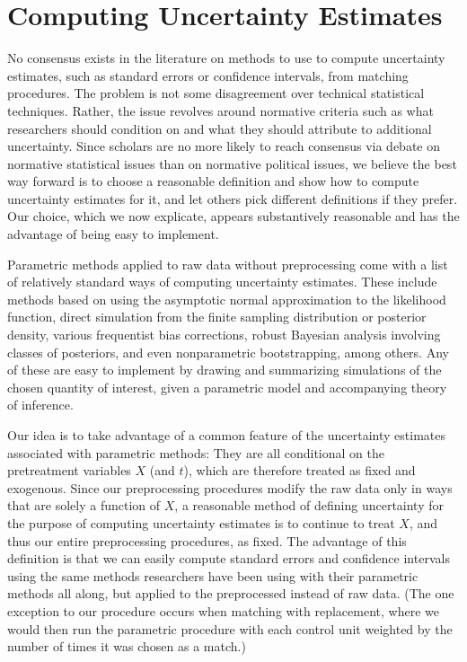 \documentclass[11pt,titlepage]{article}
\begin{document}
\section{Computing Uncertainty Estimates}

No consensus exists in the literature on methods to use to compute
uncertainty estimates, such as standard errors or confidence
intervals, from matching procedures.  The problem is not some
disagreement over technical statistical techniques.  Rather, the issue
revolves around normative criteria such as what researchers should
condition on and what they should attribute to additional uncertainty.
Since scholars are no more likely to reach consensus via debate on
normative statistical issues than on normative political issues, we
believe the best way forward is to choose a reasonable definition and
show how to compute uncertainty estimates for it, and let others pick
different definitions if they prefer.  Our choice, which we now
explicate, appears substantively reasonable and has the advantage of
being easy to implement.

Parametric methods applied to raw data without preprocessing come with
a list of relatively standard ways of computing uncertainty estimates.
These include methods based on using the asymptotic normal
approximation to the likelihood function, direct simulation from the
finite sampling distribution or posterior density, various frequentist
bias corrections, robust Bayesian analysis involving classes of
posteriors, and even nonparametric bootstrapping, among others.  Any
of these are easy to implement by drawing and summarizing simulations
of the chosen quantity of interest, given a parametric model and
accompanying theory of inference.

Our idea is to take advantage of a common feature of the uncertainty
estimates associated with parametric methods: They are all conditional
on the pretreatment variables $X$ (and $t$), which are therefore
treated as fixed and exogenous.  Since our preprocessing procedures
modify the raw data only in ways that are solely a function of $X$, a
reasonable method of defining uncertainty for the purpose of computing
uncertainty estimates is to continue to treat $X$, and thus our entire
preprocessing procedures, as fixed.  The advantage of this definition
is that we can easily compute standard errors and confidence intervals
using the same methods researchers have been using with their
parametric methods all along, but applied to the preprocessed instead
of raw data.  (The one exception to our procedure occurs when matching
with replacement, where we would then run the parametric procedure
with each control unit weighted by the number of times it was chosen as a match.)
\end{document}
